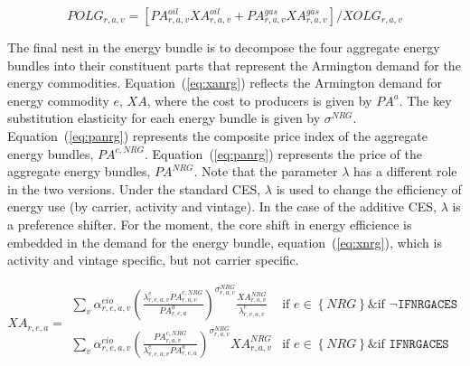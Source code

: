 \documentclass[11pt,letterpaper]{report}
\begin{document}
\begin{equation}
\label{eq:polg}
\mathit{POLG}_{r,a,v} = \left[\mathit{PA}^{\mathit{oil}}_{r,a,v} \mathit{XA}^{\mathit{oil}}_{r,a,v}
+ \mathit{PA}^{\mathit{gas}}_{r,a,v} \mathit{XA}^{\mathit{gas}}_{r,a,v} \right] \bigg / \mathit{XOLG}_{r,a,v}
\end{equation}

The final nest in the energy bundle is to decompose the four aggregate energy
bundles into their constituent parts that represent the Armington demand for the
energy commodities. Equation~(\ref{eq:xanrg}) reflects the Armington demand for
energy commodity $e$, $\mathit{XA}$, where the cost to producers is given by
$\mathit{PA}^a$. The key substitution elasticity for each energy bundle is given
by $\sigma^{\mathit{NRG}}$. Equation~(\ref{eq:panrg}) represents the composite price
index of the aggregate energy bundles, $\mathit{PA}^{c,\mathit{NRG}}$.
Equation~(\ref{eq:panrg}) represents the price of
the aggregate energy bundles, $\mathit{PA}^{\mathit{NRG}}$. Note that the
parameter $\lambda$ has a different role in the two versions. Under the
standard CES, $\lambda$ is used to change the efficiency of energy use
(by carrier, activity and vintage). In the case of the additive CES, $\lambda$
is a preference shifter. For the moment, the core shift in energy efficience
is embedded in the demand for the energy bundle, equation~(\ref{eq:xnrg}),
which is activity and vintage specific, but not carrier specific.

\begin{equation}
\label{eq:xanrg}
\mathit{XA}_{r,e,a} =
\begin{array}{*{20}{l}}
   \displaystyle \sum_v{
      \alpha^{\mathit{eio}}_{r,e,a,v}
      \left( \frac {\lambda^{\mathit{e}}_{r,e,a,v}
         \mathit{PA}^{c,\mathit{NRG}}_{r,a,v}} {\mathit{PA}^a_{r,e,a}}
      \right)^{\sigma^{\mathit{NRG}}_{r,a,v}}
      \frac {\mathit{XA}^{\mathit{NRG}}_{r,a,v}}
         {\lambda^{\mathit{e}}_{r,e,a,v}}
   }
   & \textrm{if } e \in \left\{ \mathit{NRG} \right\} \& \textrm{if } \lnot \texttt{IFNRGACES} \\
      \displaystyle \sum_v{
         \alpha^{\mathit{eio}}_{r,e,a,v}
         \left( \frac {\mathit{PA}^{c,\mathit{NRG}}_{r,a,v}} {\lambda^{\mathit{e}}_{r,e,a,v} \mathit{PA}^a_{r,e,a}}
         \right)^{\sigma^{\mathit{NRG}}_{r,a,v}}
         {\mathit{XA}^{\mathit{NRG}}_{r,a,v}}
      }
      & \textrm{if } e \in \left\{ \mathit{NRG} \right\} \& \textrm{if } \texttt{IFNRGACES} \\
\end{array}
\end{equation}
\end{document}

